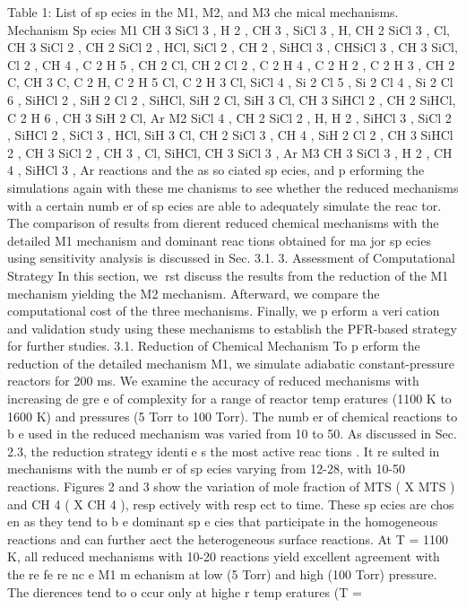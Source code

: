 \documentclass[10pt, letterpaper]{article}
\begin{document}
Table 1: List of sp ecies in the M1, M2, and M3 che mical mechanisms.
Mechanism
Sp ecies
M1
CH
3
SiCl
3
, H
2
, CH
3
, SiCl
3
, H, CH
2
SiCl
3
, Cl, CH
3
SiCl
2
, CH
2
SiCl
2
, HCl, SiCl
2
, CH
2
,
SiHCl
3
, CHSiCl
3
, CH
3
SiCl, Cl
2
, CH
4
, C
2
H
5
, CH
2
Cl, CH
2
Cl
2
, C
2
H
4
, C
2
H
2
, C
2
H
3
,
CH
2
C, CH
3
C, C
2
H, C
2
H
5
Cl, C
2
H
3
Cl, SiCl
4
, Si
2
Cl
5
, Si
2
Cl
4
, Si
2
Cl
6
, SiHCl
2
, SiH
2
Cl
2
,
SiHCl, SiH
2
Cl, SiH
3
Cl, CH
3
SiHCl
2
, CH
2
SiHCl, C
2
H
6
, CH
3
SiH
2
Cl, Ar
M2
SiCl
4
, CH
2
SiCl
2
, H, H
2
, SiHCl
3
, SiCl
2
, SiHCl
2
, SiCl
3
, HCl, SiH
3
Cl,
CH
2
SiCl
3
, CH
4
, SiH
2
Cl
2
, CH
3
SiHCl
2
, CH
3
SiCl
2
, CH
3
, Cl, SiHCl, CH
3
SiCl
3
, Ar
M3
CH
3
SiCl
3
, H
2
, CH
4
, SiHCl
3
, Ar
reactions and the as so ciated sp ecies, and p erforming the simulations again with these me chanisms to see
whether the reduced mechanisms with a certain numb er of sp ecies are able to adequately simulate the reac tor.
The comparison of results from dierent reduced chemical mechanisms with the detailed M1 mechanism and
dominant reac tions obtained for ma jor sp ecies using sensitivity analysis is discussed in Sec. 3.1.
3. Assessment of Computational Strategy
In this section, we rst discuss the results from the reduction of the M1 mechanism yielding the M2
mechanism. Afterward, we compare the computational cost of the three mechanisms. Finally, we p erform
a verication and validation study using these mechanisms to establish the PFR-based strategy for further
studies.
3.1. Reduction of Chemical Mechanism
To p erform the reduction of the detailed mechanism M1, we simulate adiabatic constant-pressure reactors
for 200 ms. We examine the accuracy of reduced mechanisms with increasing de gre e of complexity for a
range of reactor temp eratures (1100 K to 1600 K) and pressures (5 Torr to 100 Torr). The numb er of
chemical reactions to b e used in the reduced mechanism was varied from 10 to 50. As discussed in Sec. 2.3,
the reduction strategy identie s the most active reac tions . It re sulted in mechanisms with the numb er of
sp ecies varying from 12-28, with 10-50 reactions.
Figures 2 and 3 show the variation of mole fraction of MTS (
X
MTS
) and CH
4
(
X
CH
4
), resp ectively
with resp ect to time. These sp ecies are chos en as they tend to b e dominant sp e cies that participate in
the homogeneous reactions and can further aect the heterogeneous surface reactions. At T = 1100 K, all
reduced mechanisms with 10-20 reactions yield excellent agreement with the re fe re nc e M1 m echanism at
low (5 Torr) and high (100 Torr) pressure. The dierences tend to o ccur only at highe r temp eratures (T =
\end{document}

